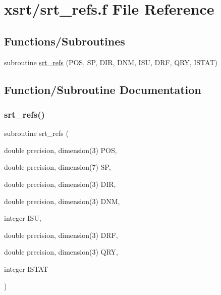 \hypertarget{srt__refs_8f}{}\section{xsrt/srt\+\_\+refs.f File Reference}
\label{srt__refs_8f}
\subsection*{Functions/\+Subroutines}
\begin{DoxyCompactItemize}
\item 
subroutine \hyperlink{srt__refs_8f_ab9077f9545e7bd6b86b78edf4a3e3115}{srt\+\_\+refs} (P\+OS, SP, D\+IR, D\+NM, I\+SU, D\+RF, Q\+RY, I\+S\+T\+AT)
\end{DoxyCompactItemize}


\subsection{Function/\+Subroutine Documentation}
\mbox{\label{srt__refs_8f_ab9077f9545e7bd6b86b78edf4a3e3115}} 
\subsubsection{\texorpdfstring{srt\+\_\+refs()}{srt\_refs()}}
{\footnotesize\ttfamily subroutine srt\+\_\+refs (\begin{DoxyParamCaption}\item[{double precision, dimension(3)}]{P\+OS,  }\item[{double precision, dimension(7)}]{SP,  }\item[{double precision, dimension(3)}]{D\+IR,  }\item[{double precision, dimension(3)}]{D\+NM,  }\item[{integer}]{I\+SU,  }\item[{double precision, dimension(3)}]{D\+RF,  }\item[{double precision, dimension(3)}]{Q\+RY,  }\item[{integer}]{I\+S\+T\+AT }\end{DoxyParamCaption})}

